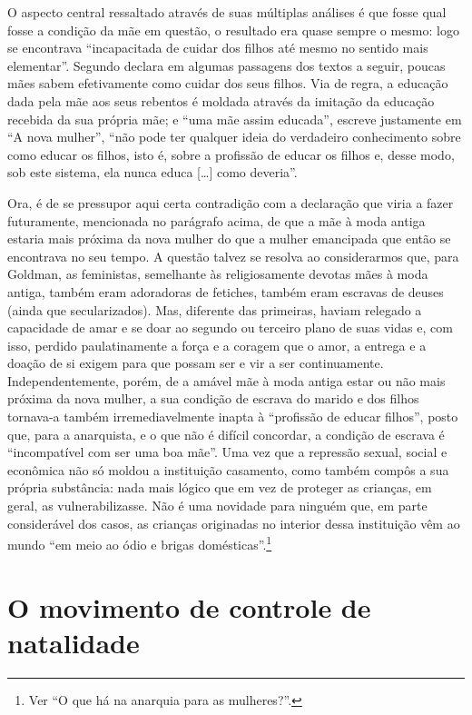 O aspecto central ressaltado através de suas múltiplas análises é que
fosse qual fosse a condição da mãe em questão, o resultado era quase
sempre o mesmo: logo se encontrava ``incapacitada de cuidar dos filhos
até mesmo no sentido mais elementar''. Segundo declara em algumas
passagens dos textos a seguir, poucas mães sabem efetivamente como
cuidar dos seus filhos. Via de regra, a educação dada pela mãe aos seus
rebentos é moldada através da imitação da educação recebida da sua
própria mãe; e ``uma mãe assim educada'', escreve justamente em ``A nova
mulher'', ``não pode ter qualquer ideia do verdadeiro conhecimento sobre
como educar os filhos, isto é, sobre a profissão de educar os filhos e,
desse modo, sob este sistema, ela nunca educa {[}\ldots{]} como deveria''.

Ora, é de se pressupor aqui certa contradição com a declaração que viria
a fazer futuramente, mencionada no parágrafo acima, de que a mãe à moda
antiga estaria mais próxima da nova mulher do que a mulher emancipada
que então se encontrava no seu tempo. A questão talvez se resolva ao
considerarmos que, para Goldman, as feministas, semelhante às
religiosamente devotas mães à moda antiga, também eram adoradoras de
fetiches, também eram escravas de deuses (ainda que secularizados). Mas,
diferente das primeiras, haviam relegado a capacidade de
amar e se doar ao segundo ou terceiro plano de suas vidas e, com isso,
perdido paulatinamente a força e a coragem que o amor, a entrega e a
doação de si exigem para que possam ser e vir a ser continuamente.
Independentemente, porém, de a amável mãe à moda antiga estar ou não
mais próxima da nova mulher, a sua condição de escrava do marido e
dos filhos tornava-a também irremediavelmente inapta à ``profissão de
educar filhos'', posto que, para a anarquista, e o que não é difícil
concordar, a condição de escrava é ``incompatível com ser uma boa mãe''.
Uma vez que a repressão sexual, social e econômica não só moldou a
instituição casamento, como também compôs a sua própria substância:
nada mais lógico que em vez de proteger as crianças, em geral, as
vulnerabilizasse. Não é uma novidade para ninguém que, em parte
considerável dos casos, as crianças originadas no interior dessa
instituição vêm ao mundo ``em meio ao ódio e brigas domésticas''.\footnote{Ver ``O
que há na anarquia para as mulheres?''.}

\section{O movimento de controle de natalidade}


